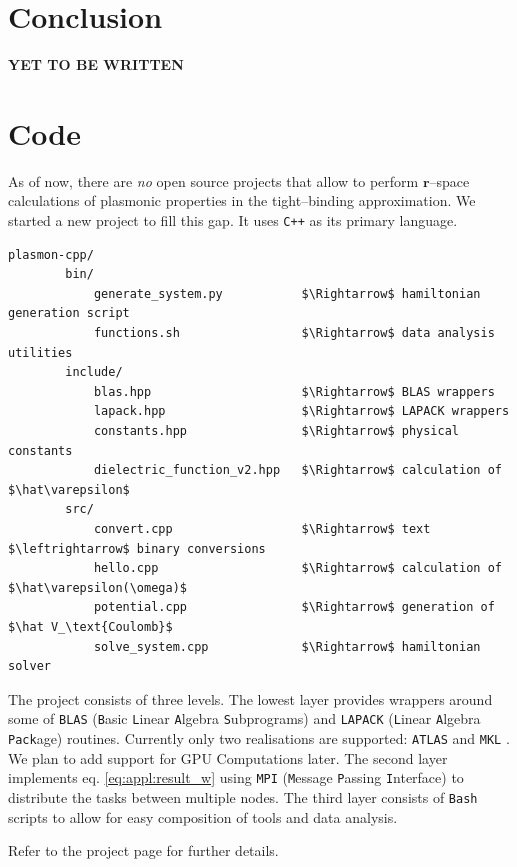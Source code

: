 \documentclass[a4paper,12pt]{article}
\begin{document}
\newpage
\section{Conclusion}
    \textbf{YET TO BE WRITTEN}


\newpage
\appendix

\section{Code}

    As of now, there are \textit{no} open source projects that allow to perform $\mathbf{r}$--space calculations of plasmonic properties in the tight--binding approximation. We started a new project \cite{plasmon-cpp} to fill this gap. It uses \texttt{C++} as its primary language.

\begin{lstlisting}[mathescape]
    plasmon-cpp/
        bin/
            generate_system.py           $\Rightarrow$ hamiltonian generation script
            functions.sh                 $\Rightarrow$ data analysis utilities
        include/
            blas.hpp                     $\Rightarrow$ BLAS wrappers
            lapack.hpp                   $\Rightarrow$ LAPACK wrappers
            constants.hpp                $\Rightarrow$ physical constants
            dielectric_function_v2.hpp   $\Rightarrow$ calculation of $\hat\varepsilon$
        src/
            convert.cpp                  $\Rightarrow$ text $\leftrightarrow$ binary conversions
            hello.cpp                    $\Rightarrow$ calculation of $\hat\varepsilon(\omega)$
            potential.cpp                $\Rightarrow$ generation of $\hat V_\text{Coulomb}$
            solve_system.cpp             $\Rightarrow$ hamiltonian solver
\end{lstlisting}

    The project consists of three levels. The lowest layer provides wrappers around some of \texttt{BLAS} (\texttt{B}asic \texttt{L}inear \texttt{A}lgebra \texttt{S}ubprograms) and \texttt{LAPACK} (\texttt{L}inear \texttt{A}lgebra \texttt{Pack}age) routines. Currently only two realisations are supported: \texttt{ATLAS} \cite{atlas_siam} and \texttt{MKL} \cite{intel-mkl}. We plan to add support for GPU Computations later. The second layer implements eq. \eqref{eq:appl:result_w} using \texttt{MPI} (\texttt{M}essage \texttt{P}assing \texttt{I}nterface) to distribute the tasks between multiple nodes. The third layer consists of \texttt{Bash} scripts to allow for easy composition of tools and data analysis.

    Refer to the project page for further details.
 


\newpage

\end{document}
